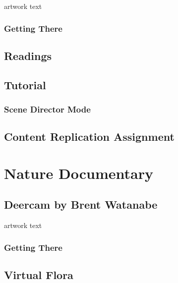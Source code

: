 \documentclass[
  openany]{book}
\begin{document}
artwork text

\hypertarget{getting-there-3}{%
\subsection{Getting There}\label{getting-there-3}}

\hypertarget{readings-2}{%
\section{Readings}\label{readings-2}}

\hypertarget{tutorial-2}{%
\section{Tutorial}\label{tutorial-2}}

\hypertarget{scene-director-mode}{%
\subsection{Scene Director Mode}\label{scene-director-mode}}

\hypertarget{content-replication-assignment-2}{%
\section{Content Replication Assignment}\label{content-replication-assignment-2}}

\hypertarget{nature-documentary}{%
\chapter{Nature Documentary}\label{nature-documentary}}

\hypertarget{deercam-by-brent-watanabe}{%
\section{Deercam by Brent Watanabe}\label{deercam-by-brent-watanabe}}

artwork text

\hypertarget{getting-there-4}{%
\subsection{Getting There}\label{getting-there-4}}

\hypertarget{virtual-flora}{%
\section{Virtual Flora}\label{virtual-flora}}
\end{document}
